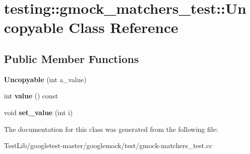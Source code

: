 \hypertarget{classtesting_1_1gmock__matchers__test_1_1Uncopyable}{}\section{testing\+:\+:gmock\+\_\+matchers\+\_\+test\+:\+:Uncopyable Class Reference}
\label{classtesting_1_1gmock__matchers__test_1_1Uncopyable}
\subsection*{Public Member Functions}
\begin{DoxyCompactItemize}
\item 
\mbox{\label{classtesting_1_1gmock__matchers__test_1_1Uncopyable_a827c1de4fe4c2e40791dd87a13972bc7}} 
{\bfseries Uncopyable} (int a\+\_\+value)
\item 
\mbox{\label{classtesting_1_1gmock__matchers__test_1_1Uncopyable_a23512131b948e40ded06555848829866}} 
int {\bfseries value} () const
\item 
\mbox{\label{classtesting_1_1gmock__matchers__test_1_1Uncopyable_a3f30b54f22caac3aa7e6fb79012dc52f}} 
void {\bfseries set\+\_\+value} (int i)
\end{DoxyCompactItemize}


The documentation for this class was generated from the following file\+:\begin{DoxyCompactItemize}
\item 
Test\+Lib/googletest-\/master/googlemock/test/gmock-\/matchers\+\_\+test.\+cc\end{DoxyCompactItemize}
